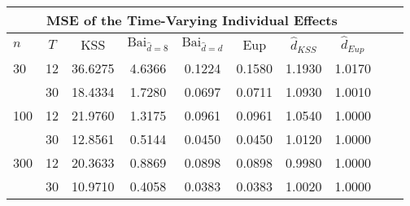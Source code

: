 \begin{tabular}{lccccccccc} 
\hline \multicolumn{8}{c}{MSE of the Time-Varying Individual Effects} \\ \hline 
$n$ & $T$ & KSS & $ \text{Bai}_{\hat{d} = 8}$ & $\text{Bai}_{\hat{d} = d}$ & Eup & $\hat{d}_{KSS}$ & $\hat{d}_{Eup}$ \\
\hline
30 & 12 &  36.6275  &  4.6366  &  0.1224  &  0.1580  &  1.1930  &  1.0170  \\
& 30 &  18.4334  &  1.7280  &  0.0697  &  0.0711  &  1.0930  &  1.0010  \\
100 & 12 &  21.9760  &  1.3175  &  0.0961  &  0.0961  &  1.0540  &  1.0000  \\
& 30 &  12.8561  &  0.5144  &  0.0450  &  0.0450  &  1.0120  &  1.0000  \\
300 & 12 &  20.3633  &  0.8869  &  0.0898  &  0.0898  &  0.9980  &  1.0000  \\
& 30 &  10.9710  &  0.4058  &  0.0383  &  0.0383  &  1.0020  &  1.0000  \\
\end{tabular} 
